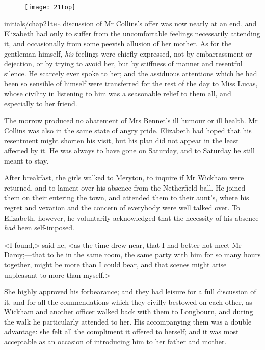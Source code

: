 
\chapter[Chapter \thechapter]{}
	
	\begin{figure}[t!]
\centering
\texttt{[image: 21top]}
\end{figure}

\lettrine[lines=6,image=true]{initials/chap21t}{he}  discussion of Mr Collins's offer was now nearly at an end, and Elizabeth had only to suffer from the uncomfortable feelings necessarily attending it, and occasionally from some peevish allusion of her mother. As for the gentleman himself, \textit{his} feelings were chiefly expressed, not by embarrassment or dejection, or by trying to avoid her, but by stiffness of manner and resentful silence. He scarcely ever spoke to her; and the assiduous attentions which he had been so sensible of himself were transferred for the rest of the day to Miss Lucas, whose civility in listening to him was a seasonable relief to them all, and especially to her friend.

The morrow produced no abatement of Mrs Bennet's ill humour or ill health. Mr Collins was also in the same state of angry pride. Elizabeth had hoped that his resentment might shorten his visit, but his plan did not appear in the least affected by it. He was always to have gone on Saturday, and to Saturday he still meant to stay.

After breakfast, the girls walked to Meryton, to inquire if Mr Wickham were returned, and to lament over his absence from the Netherfield ball. He joined them on their entering the town, and attended them to their aunt's, where his regret and vexation and the concern of everybody were well talked over. To Elizabeth, however, he voluntarily acknowledged that the necessity of his absence \textit{had} been self-imposed.

<I found,> said he, <as the time drew near, that I had better not meet Mr Darcy;—that to be in the same room, the same party with him for so many hours together, might be more than I could bear, and that scenes might arise unpleasant to more than myself.>

She highly approved his forbearance; and they had leisure for a full discussion of it, and for all the commendations which they civilly bestowed on each other, as Wickham and another officer walked back with them to Longbourn, and during the walk he particularly attended to her. His accompanying them was a double advantage: she felt all the compliment it offered to herself; and it was most acceptable as an occasion of introducing him to her father and mother.

